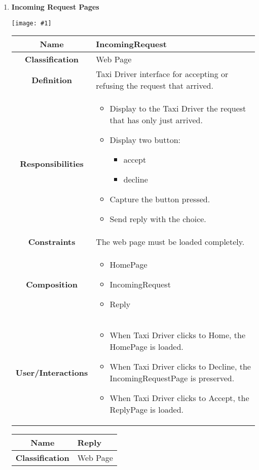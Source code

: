 \documentclass[11pt, a4paper,titlepage]{article}
\newcommand{\image}[1]{
	\begin{center}
		\noindent \texttt{[image: \#1]}
	\end{center}
	}
\begin{document}
\begin{enumerate}
\newpage
\item \textbf{Incoming Request Pages}\\
\image{page_incomingrequest.png}
\begin{tabularx}{\textwidth}{| c | X |}
	\hline
	\textbf{Name} &
	IncomingRequest
	\\
	\hline
	\textbf{Classification} &
	Web Page
	\\
	\hline
	\textbf{Definition} &
	Taxi Driver interface for accepting or refusing the request that arrived.\\
	\hline
	\textbf{Responsibilities} &
	\begin{itemize}
		\item Display to the Taxi Driver the request that has only just arrived.
		\item Display two button:
		\begin{itemize}
			\item accept
			\item decline
		\end{itemize} 	
		\item Capture the button pressed.
		\item Send reply with the choice.	
	\end{itemize}
	\\
	\hline
	\textbf{Constraints} & The web page must be loaded completely.
	\\
	\hline
	\textbf{Composition} &
	\begin{itemize}
		\item HomePage
		\item IncomingRequest
		\item Reply
	\end{itemize}
	\\
	\hline
	\textbf{User/Interactions} &
	\begin{itemize}
		\item When Taxi Driver clicks to Home, the HomePage is loaded.
		\item When Taxi Driver clicks to Decline, the IncomingRequestPage is preserved.
		\item When Taxi Driver clicks to Accept, the ReplyPage is loaded.
	\end{itemize}
	\\
	\hline 
\end{tabularx}
\begin{tabularx}{\textwidth}{| c | X |}
	\hline
	\textbf{Name} &
	Reply
	\\
	\hline
	\textbf{Classification} &
	Web Page
	\\

\end{tabularx}
\end{enumerate}
\end{document}
